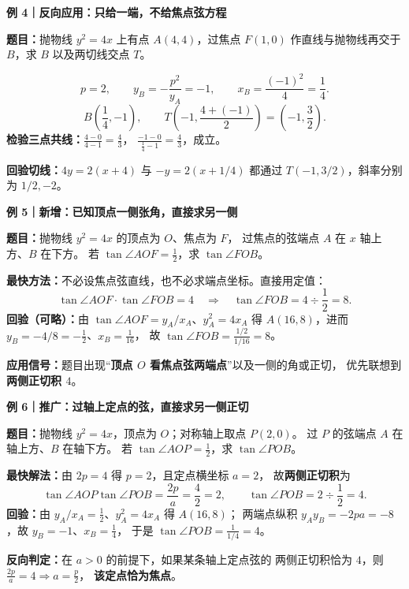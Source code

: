 \begin{examplebox}
\begin{center}\end{center}

\textbf{\textcolor{CExample}{例 4｜反向应用：只给一端，不给焦点弦方程}}\par\smallskip
\textbf{题目：}抛物线 $y^2=4x$ 上有点 $A(4,4)$，过焦点 $F(1,0)$ 作直线与抛物线再交于 $B$，求 $B$ 以及两切线交点 $T$。\par\smallskip
\[
 p=2,\qquad y_B=-\frac{p^2}{y_A}=-1,\qquad
 x_B=\frac{(-1)^2}{4}=\frac14.
\]
\[
 \boxed{B\!\left(\frac14,-1\right)},\qquad
 \boxed{T\!\left(-1,\frac{4+(-1)}{2}\right)=\left(-1,\frac32\right)}.
\]
\textbf{检验三点共线：}$\frac{4-0}{4-1}=\frac43$，
$\frac{-1-0}{\frac14-1}=\frac43$，成立。

\par\smallskip\textbf{回验切线：}$4y=2(x+4)$ 与 $-y=2(x+1/4)$ 都通过 $T(-1,3/2)$，斜率分别为 $1/2,-2$。
\end{examplebox}
\clearpage
\begin{examplebox}
\textbf{\textcolor{CExample}{例 5｜新增：已知顶点一侧张角，直接求另一侧}}\par\smallskip
\begin{center}\end{center}
\textbf{题目：}抛物线 $y^2=4x$ 的顶点为 $O$、焦点为 $F$，
过焦点的弦端点 $A$ 在 $x$ 轴上方、$B$ 在下方。
若 $\tan\angle AOF=\frac12$，求 $\tan\angle FOB$。

\textbf{最快方法：}不必设焦点弦直线，也不必求端点坐标。直接用定值：
\[
 \tan\angle AOF\cdot\tan\angle FOB=4
 \quad\Longrightarrow\quad
 \boxed{\tan\angle FOB=4\div\frac12=8}.
\]
\textbf{回验（可略）：}由 $\tan\angle AOF=y_A/x_A$、$y_A^2=4x_A$ 得
$A(16,8)$，进而 $y_B=-4/8=-\frac12$、$x_B=\frac1{16}$，
故 $\tan\angle FOB=\frac{1/2}{1/16}=8$。

\textbf{应用信号：}题目出现“\textbf{顶点 $O$ 看焦点弦两端点}”以及一侧的角或正切，
优先联想到\textbf{两侧正切积 $4$}。
\end{examplebox}
\clearpage
\begin{examplebox}
\textbf{\textcolor{CExample}{例 6｜推广：过轴上定点的弦，直接求另一侧正切}}\par\smallskip
\begin{center}\end{center}
\textbf{题目：}抛物线 $y^2=4x$，顶点为 $O$；对称轴上取点 $P(2,0)$。
过 $P$ 的弦端点 $A$ 在轴上方、$B$ 在轴下方。
若 $\tan\angle AOP=\frac12$，求 $\tan\angle POB$。

\textbf{最快解法：}由 $2p=4$ 得 $p=2$，且定点横坐标 $a=2$，
故\textbf{两侧正切积}为
\[
 \tan\angle AOP\tan\angle POB=\frac{2p}{a}
 =\frac4{2}=2,
\qquad \boxed{\tan\angle POB=2\div\frac12=4}.
\]
\textbf{回验：}由 $y_A/x_A=\frac12$、$y_A^2=4x_A$ 得 $A(16,8)$；
两端点纵积 $y_Ay_B=-2pa=-8$，故 $y_B=-1$、$x_B=\frac14$，
于是 $\tan\angle POB=\frac{1}{1/4}=4$。

\textbf{反向判定：}在 $a>0$ 的前提下，如果某条轴上定点弦的
两侧正切积恰为 $4$，则 $\frac{2p}{a}=4\Rightarrow a=\frac p2$，
\textbf{该定点恰为焦点}。
\end{examplebox}
